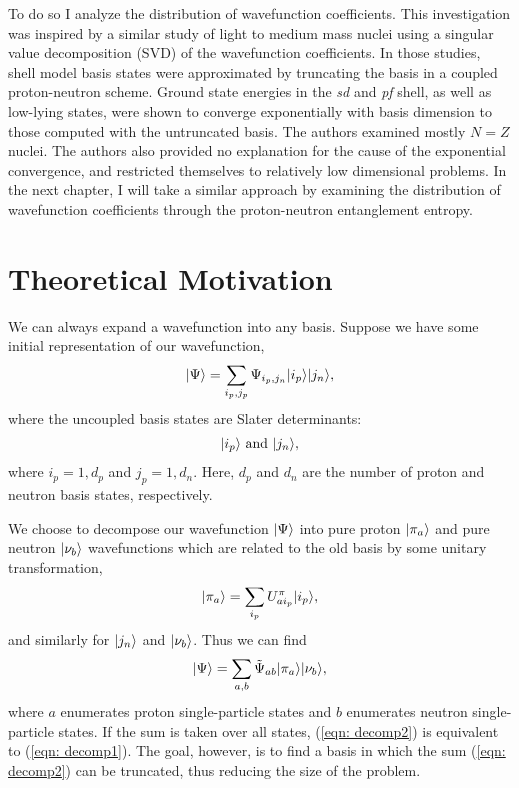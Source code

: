 To do so I analyze the distribution of wavefunction coefficients. This 
investigation was inspired by a similar study of
light to medium mass nuclei using a singular value decomposition (SVD)
of the wavefunction coefficients\cite{Papenbrock03,Papenbrock04,Papenbrock05}.
In those studies, shell model basis states were approximated
by truncating the basis in a coupled proton-neutron scheme. 
Ground state energies in the \textit{sd} and \textit{pf} shell, as well as 
low-lying states, were shown to converge exponentially with basis dimension to those 
computed with the untruncated basis.
The authors examined mostly
$N=Z$ nuclei. The authors also provided no explanation for the 
cause of the exponential convergence, and restricted themselves to relatively 
low dimensional problems.
In the next chapter, I will take a similar approach by examining the 
distribution of wavefunction coefficients through the proton-neutron entanglement
entropy.  


\section{Theoretical Motivation}
We can always expand a wavefunction into any basis. Suppose we have 
some initial representation of our wavefunction,
\begin{equation} \label{eqn: decomp1}
    |\Psi\rangle=\sum_{i_p,j_p} \Psi_{i_p,j_n} |i_p\rangle|j_n\rangle,
\end{equation}    
where the uncoupled basis states are Slater determinants:
\begin{equation}\begin{split}
    |i_p\rangle \textrm{ and }|j_n\rangle, 
\end{split}\end{equation}
where $i_p = 1, d_p$ and $j_p = 1, d_n$. Here, $d_p$ and $d_n$ are the number 
of proton and neutron basis states, respectively.

We choose to decompose our wavefunction $|\Psi\rangle$ into pure proton 
$|\pi_a\rangle$ and pure neutron $|\nu_b\rangle$ wavefunctions which are 
related to the old basis by some 
unitary transformation, 
\begin{equation}\label{unitary}
    |\pi_a\rangle=\sum_{i_p}U_{ai_p}^\pi |i_p\rangle,
\end{equation}
and similarly for $|j_n\rangle$ and $|\nu_b\rangle$.
Thus we can find
\begin{equation}\label{eqn: decomp2} \begin{split}
    |\Psi\rangle  =\sum_{a,b} \tilde{\Psi}_{ab}|\pi_a\rangle|\nu_b\rangle,
\end{split}\end{equation}  
where $a$ enumerates proton single-particle states and $b$ enumerates 
neutron single-particle states. If the sum is taken over all states, (\ref{eqn: decomp2}) is equivalent to 
(\ref{eqn: decomp1}). The goal, however, is to find a basis in which the 
sum (\ref{eqn: decomp2}) can be truncated, thus reducing the size of the problem.


